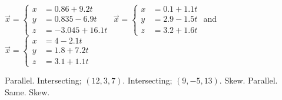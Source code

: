 \begin{Exercise}[
name={},
title={}, 
difficulty=0,
origin={\cite{GHC}}]
$\vec x = \left\{\begin{aligned} x&= 0.86+9.2t\\ y&= 0.835-6.9t\\ z&= -3.045+16.1t\end{aligned}\right.$
\Question $\vec x = \left\{\begin{aligned} x&= 0.1+1.1t\\ y&= 2.9-1.5t\\ z&= 3.2+1.6t\end{aligned}\right.$ \quad and \quad
$\vec x = \left\{\begin{aligned} x&= 4-2.1t\\ y&= 1.8+7.2t\\ z&= 3.1+1.1t\end{aligned}\right.$

\end{Exercise}
\begin{Answer}
\Question Parallel.
\Question Intersecting; $(12,3,7)$.
\Question Intersecting; $(9,-5,13)$.
\Question Skew.
\Question Parallel.
\Question Same.
\Question Skew.
\end{Answer}
